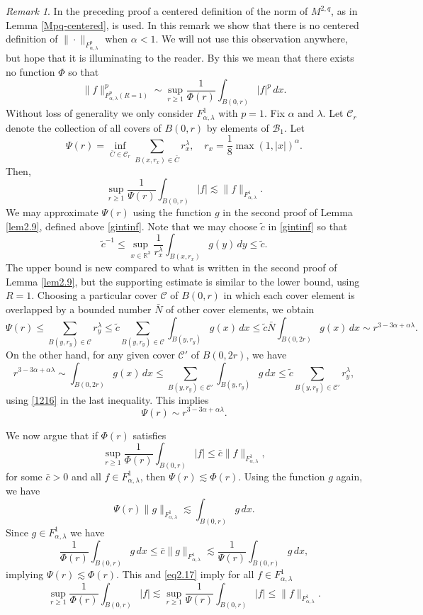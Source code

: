\documentclass[11pt]{article}
\numberwithin{equation}{section}
\theoremstyle{remark}
\newtheorem{remark}[thm]{Remark}
\theoremstyle{definition}
\newcommand{\cB}{\mathcal{B}}
\newcommand{\R}{\mathbb{R}}
\newcommand\al{\alpha}
\newcommand\la{\lambda}
\newcommand{\td}{\tilde}
\newcommand{\EQ}[1]{\begin{equation} #1 \end{equation}}
\begin{document}
\begin{remark} \label{rem2.11}
In the preceding proof a centered definition of the norm of  $M^{2,q}$, {as in Lemma \ref{Mpq-centered}}, is used.  In this remark we show that there is no  centered definition of $\|\cdot\|_{F^{p}_{\al,\la}}$ when $\al< 1$. We will not use this observation anywhere, but hope that it is illuminating to the reader.
By this we mean that there exists no function $\Phi$ so that
\EQ{\label{eq2.16}
\|f\|_{F^p_{\al,\la}{(R=1)}}^p \sim \sup_{r\geq 1}\frac 1 {\Phi(r)} \int_{B(0,r)}|f|^p\,dx.
}
Without loss of generality we only consider $F^1_{\al,\la}$ {with $p=1$.}
Fix $\al$ and $\la$.
Let $\mathscr C_r$ denote the collection of all covers of $B(0,r)$ by elements of {$\cB_1$}. 
Let
\[
\Psi(r) = \inf_{\bar C\in \mathscr C_r} \sum_{B(x,r_x)\in \bar C} r_x^\la, \quad
{r_x = \frac18 \max(1,|x|)^\al.}
\]
Then, 
\EQ{\label{eq2.17}
\sup_{r\geq 1} \frac 1 {\Psi(r)} \int_{B(0,r)} |f| \lesssim \|f\|_{F^1_{\al,\la}}.
}
We may approximate $\Psi(r)$  using the function $g$ in the second proof of Lemma \ref{lem2.9}, {defined above \eqref{gintinf}.} Note that we may choose $\td c$ {in \eqref{gintinf}} so that
\EQ{\label{1216}
\td c^{-1}\leq \sup_{x\in \R^3}\frac 1 {r_x^\la} \int_{B(x,r_x)}g(y)\,dy\leq \td c.
}
The upper bound is new compared to what is written in the second  proof of Lemma \ref{lem2.9}, but the supporting estimate is similar to the lower bound, {using $R=1$}.
%
%
%
%
%
%
%
%
%
%
%
Choosing a particular cover $\mathscr C$ of $B(0,r)$ in which each cover element is overlapped by a bounded number $\bar N$ of other cover elements, we obtain
\[
\Psi(r) \leq \sum_{B(y,r_y) \in \mathscr C} r_{y}^\la \leq \td c \sum_{B(y,r_y) \in \mathscr C}\int_{B(y,r_y)}g(x)\,dx  \leq \td c \bar N\int_{B(0,2r)} g(x)\,dx \sim r^{3-3\al +\al \la}. 
\]
On the other hand, for any given cover $\mathscr C'$ of $B(0,2r)$, we have 
\[
r^{3-3\al +\al \la} \sim \int_{B(0,2r)} g(x)\,dx\leq \sum_{B(y,r_y)\in\mathscr C'}\int_{B(y ,r_y)}  g \,dx \leq 
\td c \sum_{B(y,r_y)\in\mathscr C'}r_y^\la,
\]
{using \eqref{1216} in the last inequality.}
This implies 
\[
\Psi(r) \sim  r^{3-3\al +\al \la}.
\]

\newcommand{\barPhi}{\Phi}
 
We now argue that if $\barPhi(r)$ satisfies 
\EQ{\label{ineq.needed}
\sup_{r\geq 1} \frac 1 {\barPhi(r)} \int_{B(0,r)} |f| \leq \bar c \|f\|_{F^1_{\al,\la}},
} 
for some $\bar c>0$ and all $f\in F^1_{\al,\la}$, 
then $ \Psi(r) \lesssim \barPhi(r)$.   Using the function $g$ again, we have 
\[
 {\Psi(r) \|g\|_{F^1_{\al,\la}}\lesssim }\int_{B(0,r)} g \,dx.
\]
Since $g\in F^1_{\al,\la}$ we have 
\[
\frac 1 {\barPhi(r)}\int_{B(0,r)}g \,dx\leq \bar c \|g\|_{F^1_{\al,\la}} \lesssim\frac 1 {\Psi(r)} \int_{B(0,r)} g \,dx,
%
\]
implying $\Psi(r)\lesssim \barPhi(r)$. This  {and \eqref{eq2.17} imply for all $f\in F^{1}_{\al,\la}$}
\EQ{\label{ineq.forContradiction}
\sup_{r\geq 1} \frac 1 {\barPhi (r)} \int_{B(0,r)} |f|   \lesssim \sup_{r\geq 1} \frac 1 {  \Psi(r)} \int_{B(0,r)} |f| \leq \|f\|_{F^1_{\al,\la}}.
}



\end{remark}
\end{document}
